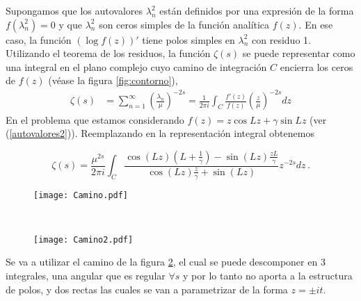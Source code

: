 Supongamos que los autovalores $\lambda ^2 _n$ están definidos por una expresión de
la forma $f ( \lambda ^2 _ n ) = 0$ y que $\lambda ^2 _n$  son ceros simples de la función analítica $f (z)$.
En ese caso, la función $( \log f (z))'$ tiene polos simples en $\lambda ^2 _n$ con residuo 1.
Utilizando el teorema de los residuos, la función $\zeta (s)$ se puede representar
como una integral en el plano complejo cuyo camino de integración $C$
encierra los ceros de $f (z)$ (véase la figura \ref{fig:contorno}),
\begin{equation}
\begin{aligned}
   \zeta  (s) &=  \sum _{n=1} ^{\infty} \left( \frac{\lambda _n}{\mu} \right) ^{-2s} 
   =  
   \frac{1}{2 \pi i} \int _{C} \frac{f'(z)}{f(z)} \left( \frac{z}{\mu} \right) ^{-2s} dz 
\end{aligned}
\label{asd}
\end{equation}
En el problema que estamos considerando $f(z) = z \cos Lz + \gamma \sin Lz$ (ver (\ref{autovalores2})). Reemplazando en la representación integral obtenemos


\begin{equation}
	\zeta  (s) = 
    \frac{\mu ^{2s}}{2 \pi i} \int _{C}
    \frac{ \cos (L z) \left(L + \frac{1}{\gamma} \right) - \sin(L z) \frac{z L}{\gamma}
    }
    { \cos(L z) \frac{z}{\gamma} + \sin(L z)
    }
     z  ^{-2 s} dz  \, .
\end{equation}


\begin{figure*}[t!]
    \centering
    \begin{subfigure}[t]{0.5\textwidth}
        \centering
        \texttt{[image: Camino.pdf]}
        \caption{}
        \label{fig.izquierda}
    \end{subfigure}%
    ~ 
    \begin{subfigure}[t]{0.5\textwidth}
        \centering
        \texttt{[image: Camino2.pdf]}
        \caption{}
        \label{fig.derecha}
    \end{subfigure}
    \caption{Estos caminos son los tenidos en cuenta para representar a la {\it función-$\zeta$} como una integral en el plano complejo.}
\label{fig:contorno}
\end{figure*}


Se va a utilizar el camino de la figura \ref{fig.derecha}, el cual se puede descomponer en 3 integrales, una angular que es regular $ \forall s$ y por lo tanto no aporta a la estructura de polos, y dos rectas las cuales se van a parametrizar de la forma $z = \pm i  t$. 

